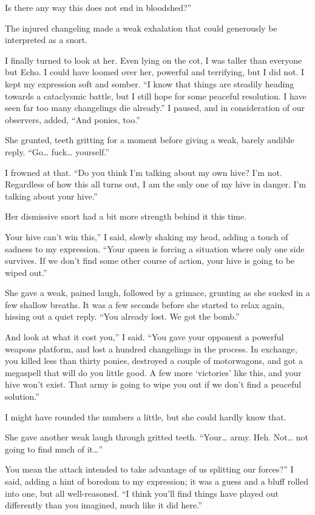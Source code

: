 \leavevmode{}Is there any way this does not end in bloodshed?”

The injured changeling made a weak exhalation that could generously be interpreted as a snort.

I finally turned to look at her. Even lying on the cot, I was taller than everyone but Echo. I could have loomed over her, powerful and terrifying, but I did not. I kept my expression soft and somber. “I know that things are steadily heading towards a cataclysmic battle, but I still hope for some peaceful resolution. I have seen far too many changelings die already.” I paused, and in consideration of our observers, added, “And ponies, too.”

She grunted, teeth gritting for a moment before giving a weak, barely audible reply. “Go… fuck… yourself.”

I frowned at that. “Do you think I’m talking about my own hive? I’m not. Regardless of how this all turns out, I am the only one of my hive in danger. I’m talking about your hive.”

Her dismissive snort had a bit more strength behind it this time.

\leavevmode{}Your hive can’t win this,” I said, slowly shaking my head, adding a touch of sadness to my expression. “Your queen is forcing a situation where only one side survives. If we don’t find some other course of action, your hive is going to be wiped out.”

She gave a weak, pained laugh, followed by a grimace, grunting as she sucked in a few shallow breaths. It was a few seconds before she started to relax again, hissing out a quiet reply. “You already lost. We got the bomb.”

\leavevmode{}And look at what it cost you,” I said. “You gave your opponent a powerful weapons platform, and lost a hundred changelings in the process. In exchange, you killed less than thirty ponies, destroyed a couple of motorwagons, and got a megaspell that will do you little good. A few more ‘victories’ like this, and your hive won’t exist. That army is going to wipe you out if we don’t find a peaceful solution.”

I might have rounded the numbers a little, but she could hardly know that.

She gave another weak laugh through gritted teeth. “Your… army. Heh. Not… not going to find much of it…”

\leavevmode{}You mean the attack intended to take advantage of us splitting our forces?” I said, adding a hint of boredom to my expression; it was a guess and a bluff rolled into one, but all well-reasoned. “I think you’ll find things have played out differently than you imagined, much like it did here.”

